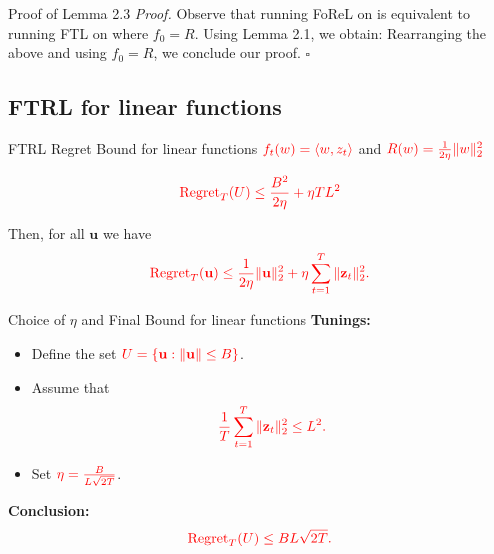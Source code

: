 \documentclass[handout]{beamer}
\begin{document}
\begin{frame}{Proof of Lemma 2.3}
    \textit{Proof.} Observe that running FoReL on  is equivalent to running FTL on  where $f_0 = R$. Using Lemma 2.1, we obtain:
    Rearranging the above and using $f_0 = R$, we conclude our proof. \hfill $\square$
  \end{frame}

  \subsection{FTRL for linear functions}
  \begin{frame}{FTRL Regret Bound for linear functions}
     $\textcolor{red}{f_t(w) = \langle w,z_t\rangle}$ and $\textcolor{red}{R(w) = \frac{1}{2\eta}\|w\|_2^2}$\\
     
    \begin{theorem}[Theorem 2.4]
\[
\textcolor{red}{\text{Regret}_T(U) \leq \frac{B^2}{2\eta} + \eta T L^2}
\]
\end{theorem}
    Then, for all \(\mathbf{u}\) we have
    \begin{equation*}
        \textcolor{red}{\text{Regret}_T(\mathbf{u}) \leq \frac{1}{2\eta} \|\mathbf{u}\|_2^2 + \eta \sum_{t=1}^{T} \|\mathbf{z}_t\|_2^2.}
    \end{equation*}
\end{frame}

\begin{frame}{Choice of \(\eta\) and Final Bound for linear functions}
    \textbf{Tunings:}
    \begin{itemize}
        \item Define the set \(\textcolor{red}{U = \{\mathbf{u} : \|\mathbf{u}\| \leq B\}}\).
        \item Assume that
        \[
        \textcolor{red}{\frac{1}{T} \sum_{t=1}^{T} \|\mathbf{z}_t\|_2^2 \leq L^2.}
        \]
        \item Set \(\textcolor{red}{\eta = \frac{B}{L\sqrt{2T}}}\).
    \end{itemize}

    \textbf{Conclusion:}
    \begin{equation*}
        \textcolor{red}{\text{Regret}_T(U) \leq B L \sqrt{2T}.}
    \end{equation*}
\end{frame}
\end{document}
